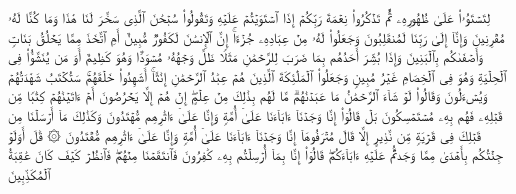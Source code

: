 \stopbuffer%
\startbuffer[\q:43:13]
لِتَسۡتَوُۥا۟ عَلَىٰ ظُهُورِهِۦ ثُمَّ تَذۡكُرُوا۟ نِعۡمَةَ رَبِّكُمۡ إِذَا ٱسۡتَوَیۡتُمۡ عَلَیۡهِ وَتَقُولُوا۟ سُبۡحَٰنَ ٱلَّذِی سَخَّرَ لَنَا هَٰذَا وَمَا كُنَّا لَهُۥ مُقۡرِنِینَ%
\stopbuffer%
\startbuffer[\q:43:14]
وَإِنَّاۤ إِلَىٰ رَبِّنَا لَمُنقَلِبُونَ%
\stopbuffer%
\startbuffer[\q:43:15]
وَجَعَلُوا۟ لَهُۥ مِنۡ عِبَادِهِۦ جُزۡءًاۚ إِنَّ ٱلۡإِنسَٰنَ لَكَفُورࣱ مُّبِینٌ%
\stopbuffer%
\startbuffer[\q:43:16]
أَمِ ٱتَّخَذَ مِمَّا یَخۡلُقُ بَنَاتࣲ وَأَصۡفَىٰكُم بِٱلۡبَنِینَ%
\stopbuffer%
\startbuffer[\q:43:17]
وَإِذَا بُشِّرَ أَحَدُهُم بِمَا ضَرَبَ لِلرَّحۡمَٰنِ مَثَلࣰا ظَلَّ وَجۡهُهُۥ مُسۡوَدࣰّا وَهُوَ كَظِیمٌ%
\stopbuffer%
\startbuffer[\q:43:18]
أَوَ مَن یُنَشَّؤُا۟ فِی ٱلۡحِلۡیَةِ وَهُوَ فِی ٱلۡخِصَامِ غَیۡرُ مُبِینࣲ%
\stopbuffer%
\startbuffer[\q:43:19]
وَجَعَلُوا۟ ٱلۡمَلَٰۤئِكَةَ ٱلَّذِینَ هُمۡ عِبَٰدُ ٱلرَّحۡمَٰنِ إِنَٰثًاۚ أَشَهِدُوا۟ خَلۡقَهُمۡۚ سَتُكۡتَبُ شَهَٰدَتُهُمۡ وَیُسۡءَلُونَ%
\stopbuffer%
\startbuffer[\q:43:20]
وَقَالُوا۟ لَوۡ شَاۤءَ ٱلرَّحۡمَٰنُ مَا عَبَدۡنَٰهُمۗ مَّا لَهُم بِذَٰلِكَ مِنۡ عِلۡمٍۖ إِنۡ هُمۡ إِلَّا یَخۡرُصُونَ%
\stopbuffer%
\startbuffer[\q:43:21]
أَمۡ ءَاتَیۡنَٰهُمۡ كِتَٰبࣰا مِّن قَبۡلِهِۦ فَهُم بِهِۦ مُسۡتَمۡسِكُونَ%
\stopbuffer%
\startbuffer[\q:43:22]
بَلۡ قَالُوۤا۟ إِنَّا وَجَدۡنَاۤ ءَابَاۤءَنَا عَلَىٰۤ أُمَّةࣲ وَإِنَّا عَلَىٰۤ ءَاثَٰرِهِم مُّهۡتَدُونَ%
\stopbuffer%
\startbuffer[\q:43:23]
وَكَذَٰلِكَ مَاۤ أَرۡسَلۡنَا مِن قَبۡلِكَ فِی قَرۡیَةࣲ مِّن نَّذِیرٍ إِلَّا قَالَ مُتۡرَفُوهَاۤ إِنَّا وَجَدۡنَاۤ ءَابَاۤءَنَا عَلَىٰۤ أُمَّةࣲ وَإِنَّا عَلَىٰۤ ءَاثَٰرِهِم مُّقۡتَدُونَ%
\stopbuffer%
\startbuffer[\q:43:24]
۞ قَٰلَ أَوَلَوۡ جِئۡتُكُم بِأَهۡدَىٰ مِمَّا وَجَدتُّمۡ عَلَیۡهِ ءَابَاۤءَكُمۡۖ قَالُوۤا۟ إِنَّا بِمَاۤ أُرۡسِلۡتُم بِهِۦ كَٰفِرُونَ%
\stopbuffer%
\startbuffer[\q:43:25]
فَٱنتَقَمۡنَا مِنۡهُمۡۖ فَٱنظُرۡ كَیۡفَ كَانَ عَٰقِبَةُ ٱلۡمُكَذِّبِینَ%
\stopbuffer%
